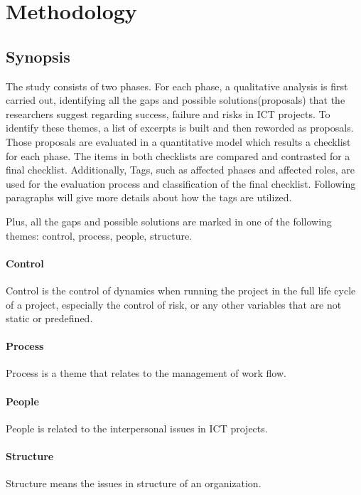
\section{Methodology}
\subsection{Synopsis}
The study consists of two phases. For each phase, a qualitative analysis is first carried out, identifying all the gaps and possible solutions(proposals) that the researchers suggest regarding success, failure and risks in ICT projects. To identify these themes, a list of excerpts is built and then reworded as proposals. Those proposals are evaluated in a quantitative model which results a checklist for each phase. The items in both checklists are compared and contrasted for a final checklist. Additionally, Tags, such as affected phases and affected roles, are used for the evaluation process and classification of the final checklist. Following paragraphs will give more details about how the tags are utilized.

Plus, all the gaps and possible solutions are marked in one of the following themes: control, process, people, structure.

\paragraph{Control} Control is the control of dynamics when running the project in the full life cycle of a project, especially the control of risk, or any other variables that are not static or predefined.

\paragraph{Process} Process is a theme that relates to the management of work flow.

\paragraph{People} People is related to the interpersonal issues in ICT projects.

\paragraph{Structure} Structure means the issues in structure of an organization. 


